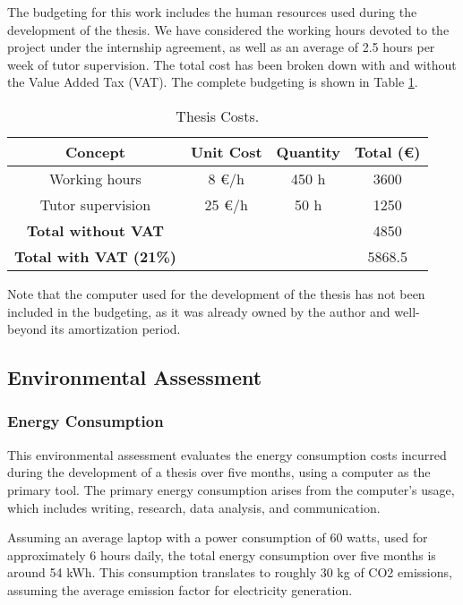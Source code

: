 \documentclass[a4paper,11pt, titlepage, twoside]{article}
\begin{document}
The budgeting for this work includes the human resources used during the development of the thesis. We have considered the working hours devoted to the project under the internship agreement, as well as an average of 2.5 hours per week of tutor supervision.
The total cost has been broken down with and without the Value Added Tax (VAT). The complete budgeting is shown in Table \ref{tab:costs}.
\begin{table}[h]
\centering
\begin{tabular}{c c c c}
\hline
\textbf{Concept} & \textbf{ Unit Cost} & \textbf{Quantity} & \textbf{ Total (\euro)} \\
\hline
Working hours & 8 \euro/h  & 450 h & 3600 \\
Tutor supervision & 25 \euro/h   &  50 h & 1250 \\
\hline
\textbf{Total without VAT} & & & 4850 \\
\hline
\textbf{Total with VAT (21\%)} & & &  5868.5 \\
\hline
\end{tabular}
\caption{Thesis Costs.}
\label{tab:costs}
\end{table}

Note that the computer used for the development of the thesis has not been included in the budgeting, as it was already owned by the author and well-beyond its amortization period.

\subsection{Environmental Assessment}

\subsubsection{Energy Consumption}

This environmental assessment evaluates the energy consumption costs incurred during
the development of a thesis over five months, using a computer as the primary tool. The primary energy consumption arises
from the computer's usage, which includes writing, research, data analysis, and communication.\par

Assuming an average laptop with a power consumption of 60 watts, used for approximately 6 hours daily, the total energy consumption
over five months is around 54 kWh. This consumption translates to roughly 30 kg of CO2 emissions, assuming the average emission
factor for electricity generation.\par
\end{document}
